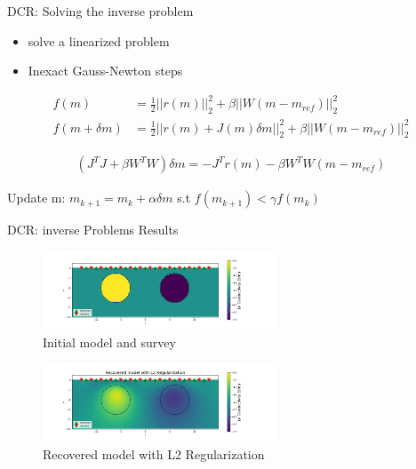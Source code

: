 \documentclass[12pt]{beamer}
\begin{document}
\begin{frame}{DCR: Solving the inverse problem}

\begin{itemize}
  \item solve a linearized problem
  \item Inexact Gauss-Newton steps
\end{itemize}

\begin{align}
f(m) &= \frac{1}{2} ||r(m)||_2^2 + \beta ||W(m-m_{ref})||_2^2 \\
f(m+\delta m) &= \frac{1}{2} ||r(m)+J(m)\delta m||_2^2 + \beta ||W(m-m_{ref})||_2^2
\end{align}


\begin{align}
(J^TJ+\beta W^TW)\delta m = -J^Tr(m) - \beta W^TW(m-m_{ref})
\end{align}

Update m: $m_{k+1} = m_k+\alpha \delta m$ s.t $f(m_{k+1}) < \gamma f(m_{k})$

\end{frame}

\begin{frame}{DCR: inverse Problems Results}


\begin{figure}[t!]
    \includegraphics[width=70mm]{figures/initialmodel.png}
    \caption{Initial model and survey}
\end{figure}

  
\begin{figure}[t!]
    \includegraphics[width=70mm]{figures/recoveredModel.png}
    \caption{Recovered model with L2 Regularization}
\end{figure}

\end{frame}
\end{document}
